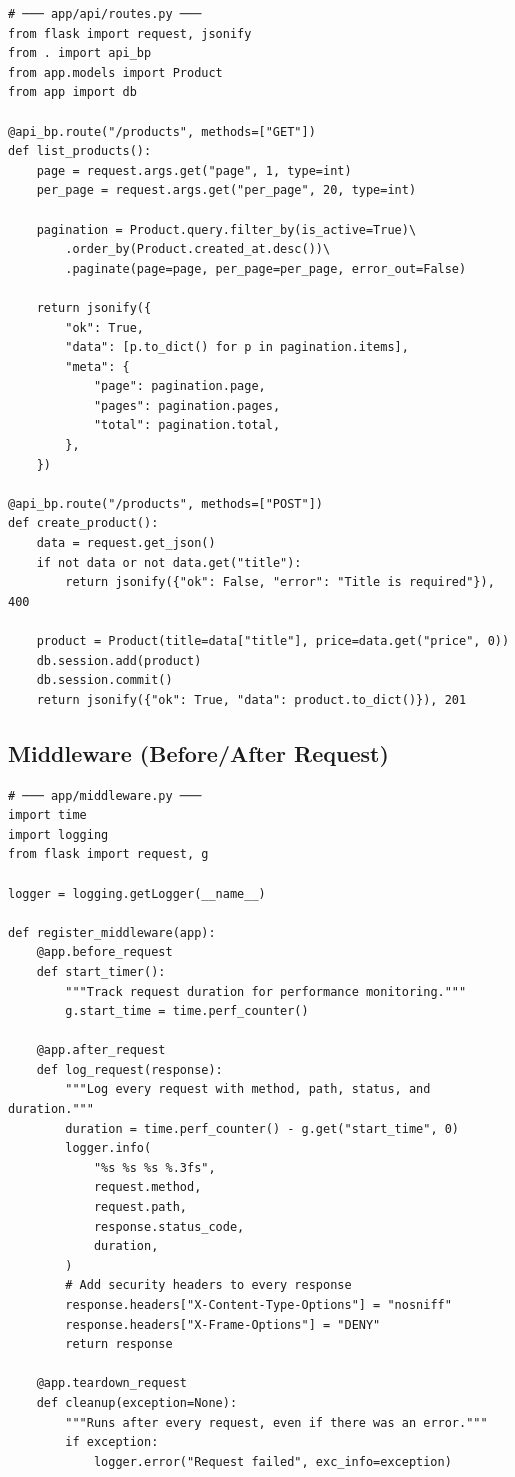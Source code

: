 \documentclass[10pt, a4paper]{article}
\begin{document}
\begin{lstlisting}[language=mypython]
# ─── app/api/routes.py ───
from flask import request, jsonify
from . import api_bp
from app.models import Product
from app import db

@api_bp.route("/products", methods=["GET"])
def list_products():
    page = request.args.get("page", 1, type=int)
    per_page = request.args.get("per_page", 20, type=int)
    
    pagination = Product.query.filter_by(is_active=True)\
        .order_by(Product.created_at.desc())\
        .paginate(page=page, per_page=per_page, error_out=False)
    
    return jsonify({
        "ok": True,
        "data": [p.to_dict() for p in pagination.items],
        "meta": {
            "page": pagination.page,
            "pages": pagination.pages,
            "total": pagination.total,
        },
    })

@api_bp.route("/products", methods=["POST"])
def create_product():
    data = request.get_json()
    if not data or not data.get("title"):
        return jsonify({"ok": False, "error": "Title is required"}), 400
    
    product = Product(title=data["title"], price=data.get("price", 0))
    db.session.add(product)
    db.session.commit()
    return jsonify({"ok": True, "data": product.to_dict()}), 201
\end{lstlisting}


\subsection{Middleware (Before/After Request)}


\begin{lstlisting}[language=mypython]
# ─── app/middleware.py ───
import time
import logging
from flask import request, g

logger = logging.getLogger(__name__)

def register_middleware(app):
    @app.before_request
    def start_timer():
        """Track request duration for performance monitoring."""
        g.start_time = time.perf_counter()
    
    @app.after_request
    def log_request(response):
        """Log every request with method, path, status, and duration."""
        duration = time.perf_counter() - g.get("start_time", 0)
        logger.info(
            "%s %s %s %.3fs",
            request.method,
            request.path,
            response.status_code,
            duration,
        )
        # Add security headers to every response
        response.headers["X-Content-Type-Options"] = "nosniff"
        response.headers["X-Frame-Options"] = "DENY"
        return response
    
    @app.teardown_request
    def cleanup(exception=None):
        """Runs after every request, even if there was an error."""
        if exception:
            logger.error("Request failed", exc_info=exception)
\end{lstlisting}
\end{document}
